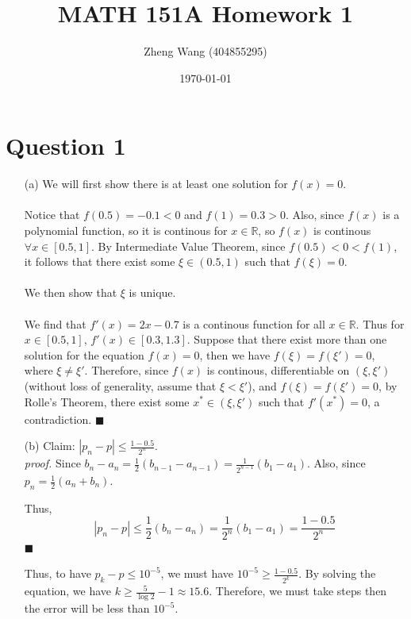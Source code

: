 \documentclass[11pt]{article}
\author{Zheng Wang (404855295)}
\date{\today}
\title{MATH 151A Homework 1}
\newcommand*{\boxtex}[1]{\framebox{#1}}
\begin{document}
\maketitle

\section*{Question 1}
\begin{itemize}
	\item[(a)]
	We will first show there is at least one solution for $ f(x)=0 $. \\\\
	 Notice that $ f(0.5) = -0.1 < 0 $ and $ f(1) = 0.3 > 0 $. Also, since $ f(x) $ is a polynomial function, so it is continous for $ x \in \mathbb{R} $, so $ f(x) $ is continous $ \forall x \in [0.5,1] $. By Intermediate Value Theorem, since $ f(0.5) < 0 < f(1) $, it follows that there exist some $ \xi \in  (0.5,1) $ such that $ f(\xi) = 0 $.\\\\
	We then show that $ \xi $ is unique.\\\\
	We find that $ f'(x) = 2x-0.7 $ is a continous function for all $ x \in \mathbb{R} $. Thus for $ x \in [0.5,1] $, $ f'(x) \in [0.3,1.3] $. Suppose that there exist more than one solution for the equation $ f(x)=0 $, then we have $ f(\xi)=f(\xi')=0 $, where $ \xi \ne \xi' $. Therefore, since $ f(x) $ is continous, differentiable on $ (\xi,\xi') $ (without loss of generality, assume that $ \xi < \xi' $), and $ f(\xi) = f(\xi')=0 $, by Rolle's Theorem, there exist some $ x^* \in (\xi, \xi') $ such that $ f'(x^*) = 0 $, a contradiction. \hfill$ \blacksquare $ 
	
	\item[(b)]
	Claim: $ \left| p_n- p \right| \le \frac{1-0.5}{2^n}  $.\\
	\textit{proof.} Since $ b_n - a_n = \frac{1}{2}(b_{n-1} - a_{n-1}) = \frac{1}{2^{n-1}}(b_1 - a_1) $. Also, since $ p_n = \frac{1}{2} (a_n+b_n) $.
	
	Thus, \[ \left| p_n - p \right| \le \frac{1}{2}\left(b_n-a_n \right) = \frac{1}{2^n}(b_1-a_1) = \frac{1-0.5}{2^n} \]
	\hfill$ \blacksquare $
	
	Thus, to have $ p_k - p \le 10^{-5} $, we must have $ 10^{-5} \ge \frac{1-0.5}{2^k} $. By solving the equation, we have $ k \ge \frac{5}{\log{2}} -1 \approx 15.6 $. Therefore, we must take \boxtex{$ k = 16 $} steps then the error will be less than $ 10^{-5} $. \pagebreak
	
	
\end{itemize}
\end{document}
